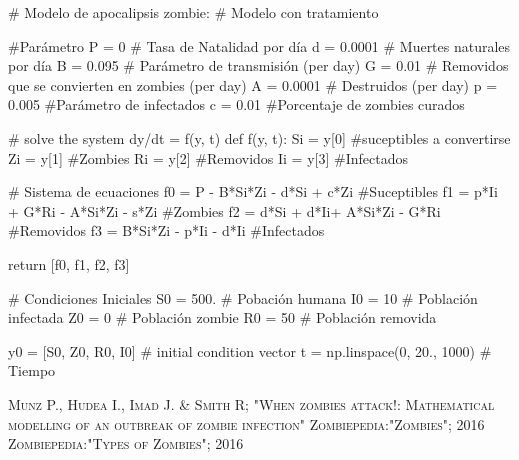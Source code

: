 \documentclass[12pt]{article}
\begin{document}
\begin{boxedverbatim}
# Modelo de apocalipsis zombie: 
# Modelo con tratamiento

#Parámetro
P = 0       # Tasa de Natalidad por día
d = 0.0001  # Muertes naturales por día
B = 0.095  # Parámetro de transmisión  (per day)
G = 0.01  # Removidos que se convierten en zombies (per day)
A = 0.0001  # Destruidos  (per day)
p = 0.005  #Parámetro de infectados
c = 0.01  #Porcentaje de zombies curados

# solve the system dy/dt = f(y, t)
def f(y, t):
    Si = y[0] #suceptibles a convertirse
    Zi = y[1] #Zombies
    Ri = y[2] #Removidos
    Ii = y[3] #Infectados
    
    # Sistema de ecuaciones
    f0 = P - B*Si*Zi - d*Si + c*Zi #Suceptibles
    f1 = p*Ii + G*Ri - A*Si*Zi - s*Zi #Zombies
    f2 = d*Si + d*Ii+ A*Si*Zi - G*Ri #Removidos
    f3 = B*Si*Zi - p*Ii - d*Ii  #Infectados

    return [f0, f1, f2, f3]

# Condiciones Iniciales
S0 = 500.                   # Pobación humana
I0 = 10                     # Población infectada
Z0 = 0                      # Población zombie
R0 = 50                      # Población removida

y0 = [S0, Z0, R0, I0]   # initial condition vector
t  = np.linspace(0, 20., 1000)       # Tiempo
\end{boxedverbatim}
\pagebreak

\begin{thebibliography}{X}
 \textsc{Munz P., Hudea I., Imad J.  \& Smith R; "When zombies attack!: Mathematical modelling of an outbreak of zombie infection"}
  \textsc{Zombiepedia:"Zombies"; 2016}
  \textsc{Zombiepedia:"Types of Zombies"; 2016}
\end{thebibliography}
\end{document}
